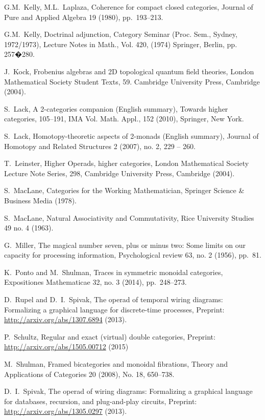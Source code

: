 \documentclass[11pt,oneside,article]{memoir}
\begin{document}
\begin{thebibliography}{XXX}
 G.M.~Kelly, M.L.~Laplaza, Coherence for compact closed categories, Journal of Pure and Applied Algebra 19 (1980), pp.~193--213.

 G.M.~Kelly, Doctrinal adjunction, Category Seminar (Proc. Sem., Sydney, 1972/1973), Lecture Notes in Math., Vol. 420, (1974) Springer, Berlin, pp. 257�280. 

 J.~Kock, Frobenius algebras and 2D topological quantum field theories, London Mathematical Society Student Texts, 59. Cambridge University Press, Cambridge (2004).

 S.~Lack, A 2-categories companion (English summary), Towards higher categories, 105--191, IMA Vol. Math. Appl., 152  (2010), Springer, New York.

 S.~Lack, Homotopy-theoretic aspects of 2-monads (English summary), Journal of Homotopy and Related Structures 2 (2007), no. 2, 229 -- 260.

 T.~Leinster, Higher Operads, higher categories, London Mathematical Society Lecture Note Series, 298, Cambridge University Press, Cambridge (2004).

 S.~MacLane, Categories for the Working Mathematician, Springer Science \& Business Media (1978).

S.~MacLane, Natural Associativity and Commutativity, Rice University Studies 49 no. 4 (1963).

 G.~Miller, The magical number seven, plus or minus two: Some limits on our capacity for processing information, Psychological review 63, no. 2 (1956), pp.~81.

 K.~Ponto and M.~Shulman, Traces in symmetric monoidal categories, Expositiones Mathematicae 32, no. 3 (2014), pp.~248--273.

 D.~Rupel and D.~I.~Spivak, The operad of temporal wiring diagrams: Formalizing a graphical language for discrete-time processes, Preprint: \url{http://arxiv.org/abs/1307.6894} (2013).

 P.~Schultz, Regular and exact (virtual) double categories, Preprint: \url{http://arxiv.org/abs/1505.00712} (2015)

 M.~Shulman, Framed bicategories and monoidal fibrations, Theory and Applications of Categories 20 (2008), No. 18, 650--738.

 D.~I.~Spivak, The operad of wiring diagrams: Formalizing a graphical language for databases, recursion, and plug-and-play circuits, Preprint: \url{http://arxiv.org/abs/1305.0297} (2013).


\end{thebibliography}
\end{document}
